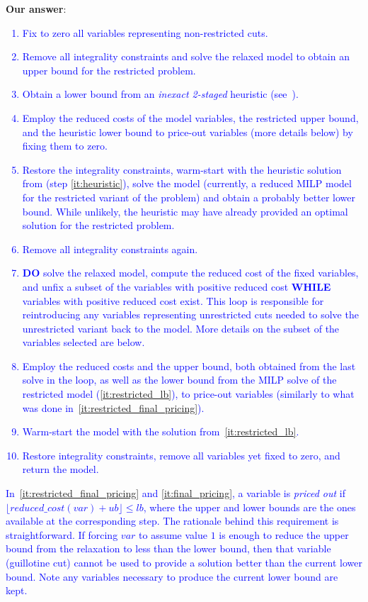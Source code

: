 \documentclass[smallextended]{svjour3}       %
\makeatletter
\newif\iffinalversion
\newcommand{\newtext}[1]{\iffinalversion%
#1%
\else%
\textcolor{blue}{#1}%
\fi%
}
\newcommand\gobblepars{%
    \@ifnextchar\par%
        {\expandafter\gobblepars\@gobble}%
        {}}
\newcounter{answer}
\newenvironment{answer}{%
    \refstepcounter{answer}\par\smallskip\noindent%
    \textbf{Our answer}: \gobblepars}%
    {\unskip\bigskip}
\makeatother
\begin{document}
\begin{answer}
\newtext{
\begin{enumerate}
\item Fix to zero all variables representing non-restricted cuts.
\item Remove all integrality constraints and solve the relaxed model to obtain an upper bound for the restricted problem.
\item Obtain a lower bound from an \emph{inexact 2-staged} heuristic (see~\cite{furini:2016,dolatabadi:2012}).\label{it:heuristic}
\item Employ the reduced costs of the model variables, the restricted upper bound, and the heuristic lower bound to price-out variables (more details below) by fixing them to zero.\label{it:restricted_final_pricing}
\item Restore the integrality constraints, warm-start with the heuristic solution from (step \autoref{it:heuristic}), solve the model (currently, a reduced MILP model for the restricted variant of the problem) and obtain a probably better lower bound. While unlikely, the heuristic may have already provided an optimal solution for the restricted problem.\label{it:restricted_lb}
\item Remove all integrality constraints again.
\item \textbf{DO} solve the relaxed model, compute the reduced cost of the fixed variables, and unfix a subset of the variables with positive reduced cost \textbf{WHILE} variables with positive reduced cost exist. This loop is responsible for reintroducing any variables representing unrestricted cuts needed to solve the unrestricted variant back to the model. More details on the subset of the variables selected are below.\label{it:loop}
\item Employ the reduced costs and the upper bound, both obtained from the last solve in the loop, as well as the lower bound from the MILP solve of the restricted model (\autoref{it:restricted_lb}), to price-out variables (similarly to what was done in~\autoref{it:restricted_final_pricing}).\label{it:final_pricing}
\item Warm-start the model with the solution from~\autoref{it:restricted_lb}.
\item Restore integrality constraints, remove all variables yet fixed to zero, and return the model.
\end{enumerate}
}

\newtext{
In~\autoref{it:restricted_final_pricing} and \autoref{it:final_pricing}, a variable is \emph{priced out} if \(\lfloor reduced\_cost(var) + ub \rfloor \leq lb\), where the upper and lower bounds are the ones available at the corresponding step. The rationale behind this requirement is straightforward. If forcing \(var\) to assume value \(1\) is enough to reduce the upper bound from the relaxation to less than the lower bound, then that variable (guillotine cut) cannot be used to provide a solution better than the current lower bound. Note any variables necessary to produce the current lower bound are kept.
}


\end{answer}
\end{document}
